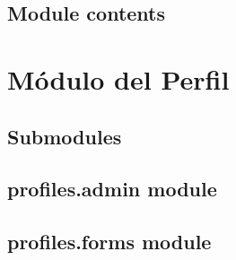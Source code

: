 \documentclass[letterpaper,10pt,spanish]{sphinxmanual}
\begin{document}

\begin{fulllineitems}
\label{notifications:notifications.views.list_notifications_sanidad}
\end{fulllineitems}


\begin{fulllineitems}
\label{notifications:notifications.views.realizedNotification}
\end{fulllineitems}



\subsection{Module contents}
\label{notifications:module-contents}\label{notifications:module-notifications}

\section{Módulo del Perfil}
\label{profiles:profiles-package}\label{profiles::doc}

\subsection{Submodules}
\label{profiles:submodules}

\subsection{profiles.admin module}
\label{profiles:profiles-admin-module}\label{profiles:module-profiles.admin}

\subsection{profiles.forms module}
\label{profiles:profiles-forms-module}\label{profiles:module-profiles.forms}
\end{document}
